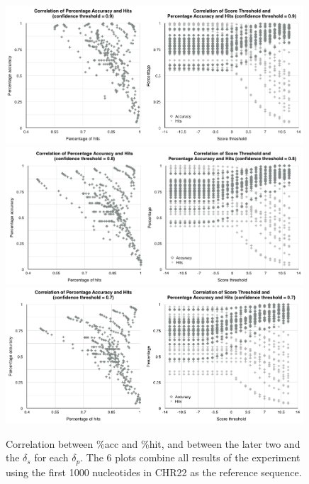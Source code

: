 \documentclass{article}
\begin{document}
\begin{figure}[tbp]
\begin{center}
\caption{Correlation between \%acc and \%hit, and between the later two and the $\delta_s$ for each $\delta_p$. The 6 plots combine all results of the experiment using the first 1000 nucleotides in CHR22 as the reference sequence.}
  \includegraphics[width=0.99\textwidth]{09}
   \includegraphics[width=0.99\textwidth]{08}
   \includegraphics[width=0.99\textwidth]{07}
\label{figure:big_page}
\end{center}
\end{figure}
\end{document}
